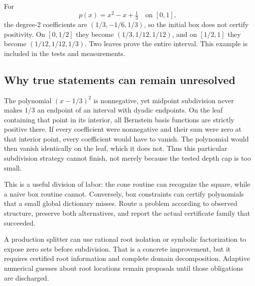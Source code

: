 For
\[
 p(x)=x^2-x+\tfrac13\quad\text{on }[0,1],
\]
the degree-2 coefficients are $(1/3,-1/6,1/3)$, so the initial box does not
certify positivity. On $[0,1/2]$ they become $(1/3,1/12,1/12)$, and on
$[1/2,1]$ they become $(1/12,1/12,1/3)$. Two leaves prove the entire interval.
This example is included in the tests and measurements.

\subsection{Why true statements can remain unresolved}

The polynomial $(x-1/3)^2$ is nonnegative, yet midpoint subdivision never makes
$1/3$ an endpoint of an interval with dyadic endpoints. On the leaf containing
that point in its interior, all Bernstein basis functions are strictly
positive there. If every coefficient were nonnegative and their sum were zero
at that interior point, every coefficient would have to vanish. The polynomial
would then vanish identically on the leaf, which it does not. Thus this
particular subdivision strategy cannot finish, not merely because the tested
depth cap is too small.

This is a useful division of labor: the cone routine can recognize the square,
while a naive box routine cannot. Conversely, box constraints can certify
polynomials that a small global dictionary misses. Route a problem according
to observed structure, preserve both alternatives, and report the actual
certificate family that succeeded.

A production splitter can use rational root isolation or symbolic factorization
to expose zero sets before subdivision. That is a concrete improvement, but
it requires certified root information and complete domain decomposition.
Adaptive numerical guesses about root locations remain proposals until those
obligations are discharged.

